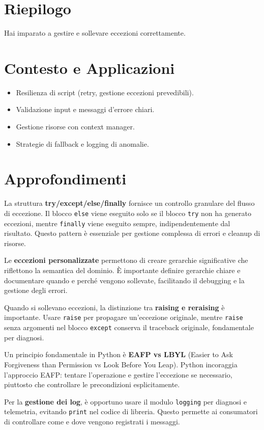 \section{Riepilogo}
Hai imparato a gestire e sollevare eccezioni correttamente.

\section{Contesto e Applicazioni}
\begin{tcolorbox}[title=Contesto e Applicazioni]
\begin{itemize}
  \item Resilienza di script (retry, gestione eccezioni prevedibili).
  \item Validazione input e messaggi d'errore chiari.
  \item Gestione risorse con context manager.
  \item Strategie di fallback e logging di anomalie.
\end{itemize}
\end{tcolorbox}

\section{Approfondimenti}
\begin{tcolorbox}[title=Spiegazioni dettagliate]
La struttura \textbf{try/except/else/finally} fornisce un controllo granulare del flusso di eccezione. Il blocco \verb|else| viene eseguito solo se il blocco \verb|try| non ha generato eccezioni, mentre \verb|finally| viene eseguito sempre, indipendentemente dal risultato. Questo pattern è essenziale per gestione complessa di errori e cleanup di risorse.

Le \textbf{eccezioni personalizzate} permettono di creare gerarchie significative che riflettono la semantica del dominio. È importante definire gerarchie chiare e documentare quando e perché vengono sollevate, facilitando il debugging e la gestione degli errori.

Quando si sollevano eccezioni, la distinzione tra \textbf{raising e reraising} è importante. Usare \verb|raise| per propagare un'eccezione originale, mentre \verb|raise| senza argomenti nel blocco \verb|except| conserva il traceback originale, fondamentale per diagnosi.

Un principio fondamentale in Python è \textbf{EAFP vs LBYL} (Easier to Ask Forgiveness than Permission vs Look Before You Leap). Python incoraggia l'approccio EAFP: tentare l'operazione e gestire l'eccezione se necessario, piuttosto che controllare le precondizioni esplicitamente.

Per la \textbf{gestione dei log}, è opportuno usare il modulo \verb|logging| per diagnosi e telemetria, evitando \verb|print| nel codice di libreria. Questo permette ai consumatori di controllare come e dove vengono registrati i messaggi.
\end{tcolorbox}

